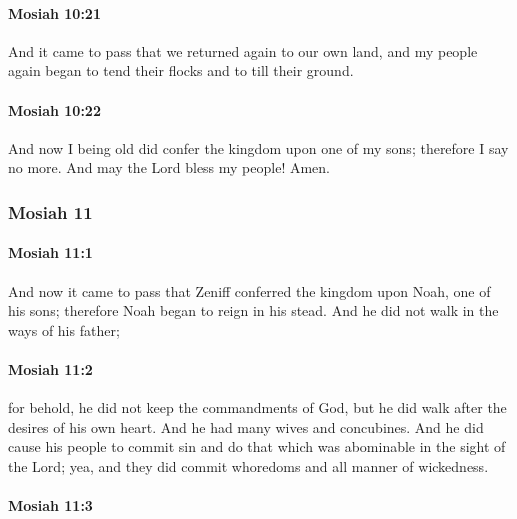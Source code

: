 		\paragraph{Mosiah 10:21} %
			\label{MOSIAH-10-21}

			And it came to pass that we returned again to our own land,
			and my people again began to tend their flocks and to till their ground.
			
		\paragraph{Mosiah 10:22} %
			\label{MOSIAH-10-22}
			
			And now I being old did confer the kingdom upon one of my sons;
			therefore I say no more.
			And may the Lord bless my people!
			Amen.

	\subsubsection{Mosiah 11} %
		\label{MOSIAH-11}
		
		\paragraph{Mosiah 11:1} %
			\label{MOSIAH-11-1}

			And now it came to pass that
			Zeniff conferred the kingdom upon Noah, one of his sons;
			therefore Noah began to reign in his stead.
			And he did not walk in the ways of his father;

		\paragraph{Mosiah 11:2} %
			\label{MOSIAH-11-2}

			for behold, he did not keep the commandments of God,
			but he did walk after the desires of his own heart.
			And he had many wives and concubines.
			And he did cause his people to commit sin
			and do that which was abominable in the sight of the Lord;
			yea, and they did commit whoredoms and all manner of wickedness.

		\paragraph{Mosiah 11:3} %
			\label{MOSIAH-11-3}

